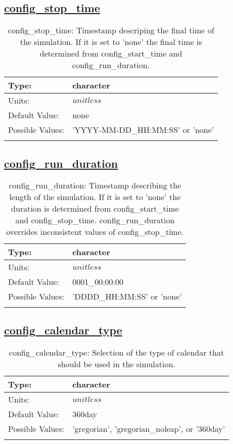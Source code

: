\subsection[config\_stop\_time]{\hyperref[sec:nm_tab_time_management]{config\_stop\_time}}
\label{subsec:nm_sec_config_stop_time}
\begin{center}
\begin{longtable}{| p{2.0in} | p{4.0in} |}
    \hline
    Type: & character \\
    \hline
    Units: & $unitless$ \\
    \hline
    Default Value: & none \\
    \hline
    Possible Values: & 'YYYY-MM-DD\_HH:MM:SS' or 'none' \\
    \hline
    \caption{config\_stop\_time: Timestamp descriping the final time of the simulation. If it is set to 'none' the final time is determined from config\_start\_time and config\_run\_duration.}
\end{longtable}
\end{center}
\subsection[config\_run\_duration]{\hyperref[sec:nm_tab_time_management]{config\_run\_duration}}
\label{subsec:nm_sec_config_run_duration}
\begin{center}
\begin{longtable}{| p{2.0in} | p{4.0in} |}
    \hline
    Type: & character \\
    \hline
    Units: & $unitless$ \\
    \hline
    Default Value: & 0001\_00:00:00 \\
    \hline
    Possible Values: & 'DDDD\_HH:MM:SS' or 'none' \\
    \hline
    \caption{config\_run\_duration: Timestamp describing the length of the simulation. If it is set to 'none' the duration is determined from config\_start\_time and config\_stop\_time. config\_run\_duration overrides inconsistent values of config\_stop\_time.}
\end{longtable}
\end{center}
\subsection[config\_calendar\_type]{\hyperref[sec:nm_tab_time_management]{config\_calendar\_type}}
\label{subsec:nm_sec_config_calendar_type}
\begin{center}
\begin{longtable}{| p{2.0in} | p{4.0in} |}
    \hline
    Type: & character \\
    \hline
    Units: & $unitless$ \\
    \hline
    Default Value: & 360day \\
    \hline
    Possible Values: & 'gregorian', 'gregorian\_noleap', or '360day' \\
    \hline
    \caption{config\_calendar\_type: Selection of the type of calendar that should be used in the simulation.}
\end{longtable}
\end{center}
